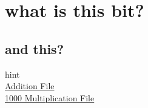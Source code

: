 \documentclass[13.5pt, varwidth=true]{beamer}
\begin{document}
\date{}

\section[topic]{what is this bit?}
\subsection[title]{and this?}

\begin{frame}[shrink=19,fragile]
\color{fore}
	hint\\[0.5cm]
	\href{run:./folder/Addition.pdf}{Addition File} \\
	\textcolor{red}{\href{run:./folder/1000 Multiplication.pdf}{1000 Multiplication File}}
\end{frame}
\end{document}

